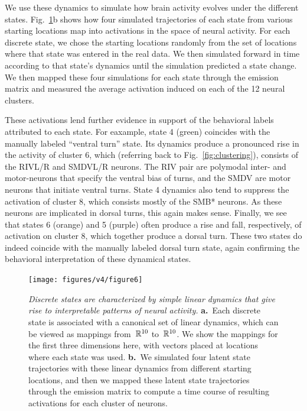 \documentclass[11pt]{article}
\begin{document}
We use these dynamics to simulate how brain activity evolves
under the different states. Fig.~\ref{fig:dynamics}b shows how four
simulated trajectories of each state from various starting locations map 
into activations in the space of neural activity. For each discrete state,
we chose the starting locations randomly from the set of locations where
that state was entered in the real data.  We then simulated forward in
time according to that state's dynamics until the simulation predicted
a state change.  We then mapped these four simulations for each state
through the emission matrix and measured the average activation induced
on each of the 12 neural clusters.

These activations lend further evidence in support of the behavioral
labels attributed to each state. For eaxample, state 4 (green) coincides
with the manually labeled ``ventral turn'' state.  Its dynamics produce
a pronounced rise in the activity of cluster 6, which (referring back
to Fig.~\ref{fig:clustering}), consists of the \textsf{RIVL/R} and
\textsf{SMDVL/R} neurons.  The \textsf{RIV} pair are polymodal inter-
and motor-neurons that specify the ventral bias of turns, and the
\textsf{SMDV} are motor neurons that initiate ventral turns.  State 4
dynamics also tend to suppress the activation of cluster 8, which
consists mostly of the \textsf{SMB*} neurons.  As these neurons are
implicated in dorsal turns, this again makes sense. Finally, we see
that states 6 (orange) and 5 (purple) often produce a rise and fall, respectively,
of activation on cluster 8, which together produce a dorsal turn.
These two states do indeed coincide with the manually labeled dorsal
turn state, again confirming the behavioral interpretation of these
dynamical states.

\begin{figure}[h!]
  \centering
  \vspace{-.5in}
  \texttt{[image: figures/v4/figure6]}
  \caption{\textit{Discrete states are characterized by
      simple linear dynamics that give rise to interpretable patterns
      of neural activity.}  \textbf{a.}~Each discrete state is
    associated with a canonical set of linear dynamics, which can be
    viewed as mappings from~$\mathbb{R}^{10}$ to~$\mathbb{R}^{10}$.  We show
    the mappings for the first three dimensions here, with vectors
    placed at locations where each state was used.  \textbf{b.}~We
    simulated four latent state trajectories with these linear
    dynamics from different starting locations, and then we mapped
    these latent state trajectories through the emission matrix to
    compute a time course of resulting activations for each cluster of
    neurons.}
  \label{fig:dynamics}
\end{figure}
\end{document}

